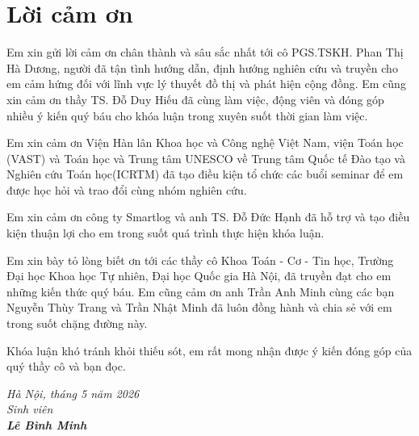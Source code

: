 
\chapter*{Lời cảm ơn}

\baselineskip
21pt

Em xin gửi lời cảm ơn chân thành và sâu sắc nhất tới cô PGS.TSKH. Phan Thị Hà Dương, người đã tận tình hướng dẫn, định hướng nghiên cứu và truyền cho em cảm hứng đối với lĩnh vực lý thuyết đồ thị và phát hiện cộng đồng. Em cũng xin cảm ơn thầy TS. Đỗ Duy Hiếu đã cùng làm việc, động viên và đóng góp nhiều ý kiến quý báu cho khóa luận trong xuyên suốt thời gian làm việc.

Em xin cảm ơn Viện Hàn lân Khoa học và Công nghệ Việt Nam, viện Toán học (VAST) và  Toán học và Trung tâm UNESCO về Trung tâm Quốc tế Đào tạo và Nghiên cứu Toán học(ICRTM) đã tạo điều kiện tổ chức các buổi seminar để em được học hỏi và trao đổi cùng nhóm nghiên cứu.

Em xin cảm ơn công ty Smartlog và anh TS. Đỗ Đức Hạnh đã hỗ trợ và tạo điều kiện thuận lợi cho em trong suốt quá trình thực hiện khóa luận.

Em xin bày tỏ lòng biết ơn tới các thầy cô Khoa Toán - Cơ - Tin học, Trường Đại học Khoa học Tự nhiên, Đại học Quốc gia Hà Nội, đã truyền đạt cho em những kiến thức quý báu. Em cũng cảm ơn anh Trần Anh Minh cùng các bạn Nguyễn Thùy Trang và Trần Nhật Minh đã luôn đồng hành và chia sẻ với em trong suốt chặng đường này.

Khóa luận khó tránh khỏi thiếu sót, em rất mong nhận được ý kiến đóng góp của quý thầy cô và bạn đọc.

\begin{flushright}
	{\it Hà Nội, tháng 5 năm 2026}\\
        {\it Sinh viên}\\
        {\it \textbf{Lê Bình Minh}}
\end{flushright}
\newpage

\cleardoublepage
